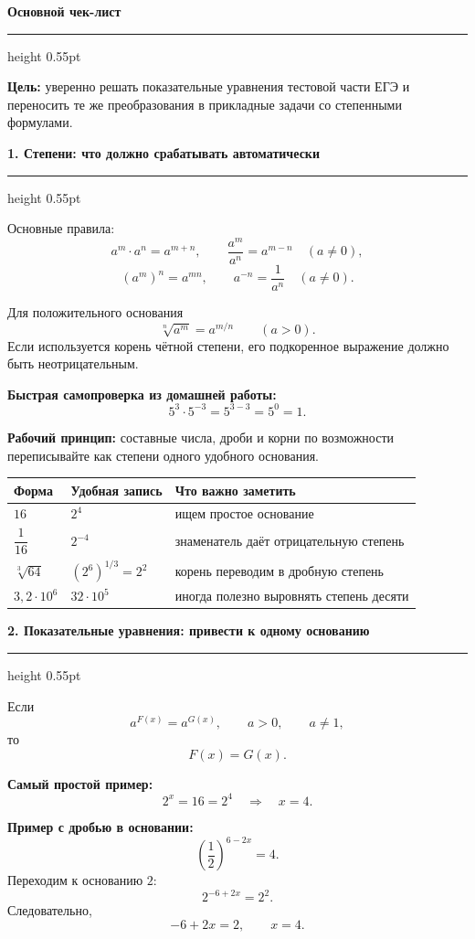 \documentclass[a4paper,12pt]{article}
\newcommand{\keyidea}[1]{\textbf{\color{darkaccent}#1}}
\newcommand{\lessonsection}[1]{%
  \vspace{0.35em}%
  {\Large\bfseries\color{darkaccent}#1\par}%
  \vspace{0.22em}%
  {\color{accent!55}\hrule height 0.55pt}%
  \vspace{0.6em}%
}
\begin{document}
\hypersetup{pageanchor=true}


\lessonsection{Основной чек-лист}

\keyidea{Цель:}
уверенно решать показательные уравнения тестовой части ЕГЭ и переносить те же преобразования в прикладные задачи со степенными формулами.

\lessonsection{1. Степени: что должно срабатывать автоматически}

Основные правила:
\[
a^m\cdot a^n=a^{m+n},
\qquad
\frac{a^m}{a^n}=a^{m-n}\quad(a\ne0),
\]
\[
(a^m)^n=a^{mn},
\qquad
a^{-n}=\frac1{a^n}\quad(a\ne0).
\]

Для положительного основания
\[
\sqrt[n]{a^m}=a^{m/n}\qquad(a>0).
\]
Если используется корень чётной степени, его подкоренное выражение должно быть неотрицательным.

\textbf{Быстрая самопроверка из домашней работы:}
\[
5^3\cdot5^{-3}=5^{3-3}=5^0=1.
\]

\keyidea{Рабочий принцип:}
составные числа, дроби и корни по возможности переписывайте как степени одного удобного основания.

\begin{center}
\renewcommand{\arraystretch}{1.3}
\begin{tabularx}{\linewidth}{@{}>{\bfseries}l X X@{}}
\toprule
Форма & Удобная запись & Что важно заметить \\
\midrule
$16$ & $2^4$ & ищем простое основание \\
$\dfrac1{16}$ & $2^{-4}$ & знаменатель даёт отрицательную степень \\
$\sqrt[3]{64}$ & $(2^6)^{1/3}=2^2$ & корень переводим в дробную степень \\
$3{,}2\cdot10^6$ & $32\cdot10^5$ & иногда полезно выровнять степень десяти \\
\bottomrule
\end{tabularx}
\end{center}

\lessonsection{2. Показательные уравнения: привести к одному основанию}

Если
\[
a^{F(x)}=a^{G(x)},
\qquad a>0,
\qquad a\ne1,
\]
то
\[
F(x)=G(x).
\]

\textbf{Самый простой пример:}
\[
2^x=16=2^4
\quad\Longrightarrow\quad
\boxed{x=4}.
\]

\textbf{Пример с дробью в основании:}
\[
\left(\frac12\right)^{6-2x}=4.
\]
Переходим к основанию $2$:
\[
2^{-6+2x}=2^2.
\]
Следовательно,
\[
-6+2x=2,
\qquad
\boxed{x=4}.
\]
\end{document}
